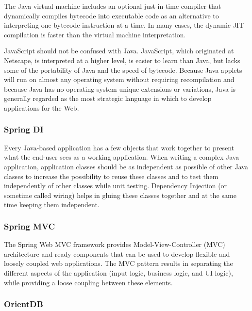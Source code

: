 \documentclass[12pt]{article}
\begin{document}
	The Java virtual machine includes an optional just-in-time compiler that dynamically compiles bytecode into executable code as an alternative to interpreting one bytecode instruction at a time. In many cases, the dynamic JIT compilation is faster than the virtual machine interpretation.

	JavaScript should not be confused with Java. JavaScript, which originated at Netscape, is interpreted at a higher level, is easier to learn than Java, but lacks some of the portability of Java and the speed of bytecode. Because Java applets will run on almost any operating system without requiring recompilation and because Java has no operating system-unique extensions or variations, Java is generally regarded as the most strategic language in which to develop applications for the Web.

\newpage
\subsubsection{Spring DI}

Every Java-based application has a few objects that work together to present what the end-user sees as a working application. When writing a complex Java application, application classes should be as independent as possible of other Java classes to increase the possibility to reuse these classes and to test them independently of other classes while unit testing. Dependency Injection (or sometime called wiring) helps in gluing these classes together and at the same time keeping them independent.

\newpage
\subsubsection{Spring MVC}

The Spring Web MVC framework provides Model-View-Controller (MVC) architecture and ready components that can be used to develop flexible and loosely coupled web applications. The MVC pattern results in separating the different aspects of the application (input logic, business logic, and UI logic), while providing a loose coupling between these elements.

\newpage
\subsubsection{OrientDB}
\end{document}

